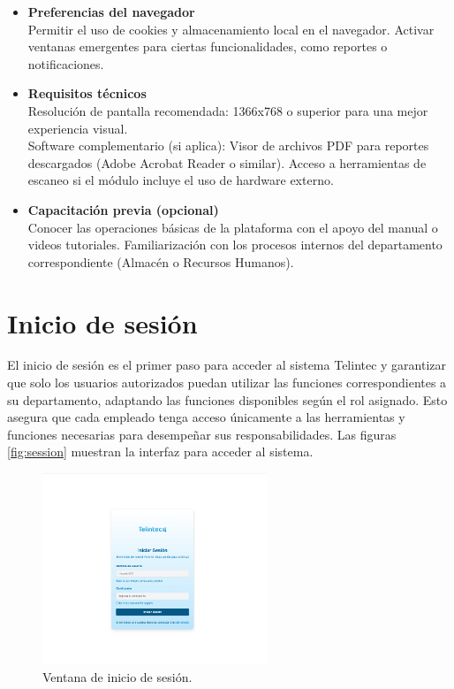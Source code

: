 \begin{itemize}
  \item \textbf{Preferencias del navegador}\\
  Permitir el uso de cookies y almacenamiento local en el navegador. Activar ventanas emergentes para ciertas funcionalidades, como reportes o notificaciones.

  \item \textbf{Requisitos técnicos}\\
  Resolución de pantalla recomendada: 1366x768 o superior para una mejor experiencia visual.\\
  Software complementario (si aplica): Visor de archivos PDF para reportes descargados (Adobe Acrobat Reader o similar). Acceso a herramientas de escaneo si el módulo incluye el uso de hardware externo.

  \item \textbf{Capacitación previa (opcional)}\\
  Conocer las operaciones básicas de la plataforma con el apoyo del manual o videos tutoriales. Familiarización con los procesos internos del departamento correspondiente (Almacén o Recursos Humanos).
\end{itemize}


\section{Inicio de sesión}
\begin{justify}
El inicio de sesión es el primer paso para acceder al sistema Telintec y garantizar que solo los usuarios autorizados puedan utilizar las funciones correspondientes a su departamento, adaptando las funciones disponibles según el rol asignado. Esto asegura que cada empleado tenga acceso únicamente a las herramientas y funciones necesarias para desempeñar sus responsabilidades. Las figuras \ref{fig:session} muestran la interfaz para acceder al sistema. 
\end{justify}


\begin{figure}[ht!]
\centering
\includegraphics[width=0.6\textwidth]{imgs/inicio de sesion/inicio_sesion_desktop.png}
\caption{Ventana de inicio de sesión.}
\label{fig:login}
\end{figure}

